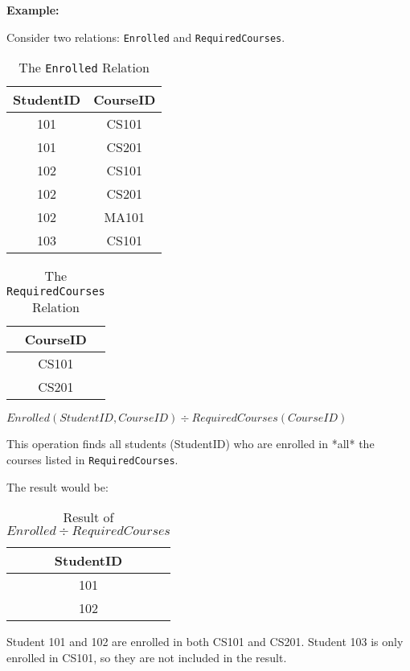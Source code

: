 \documentclass[12pt]{book}
\begin{document}
\textbf{Example:}

Consider two relations: \texttt{Enrolled} and \texttt{RequiredCourses}.

\begin{table}[htbp]
\centering
\begin{tabular}{@{}cc@{}}
\toprule
StudentID & CourseID \\
\midrule
101 & CS101 \\
101 & CS201 \\
102 & CS101 \\
102 & CS201 \\
102 & MA101 \\ %
103 & CS101 \\ %
\bottomrule
\end{tabular}
\caption{The \texttt{Enrolled} Relation}
\label{tab:enrolled_division}
\end{table}

\begin{table}[htbp]
\centering
\begin{tabular}{@{}c@{}}
\toprule
CourseID \\
\midrule
CS101 \\
CS201 \\
\bottomrule
\end{tabular}
\caption{The \texttt{RequiredCourses} Relation}
\label{tab:required_courses_division}
\end{table}

$\mathit{Enrolled}(\textit{StudentID}, \textit{CourseID}) \div \mathit{RequiredCourses}(\textit{CourseID})$

This operation finds all students (StudentID) who are enrolled in *all* the courses listed in \texttt{RequiredCourses}.

The result would be:

\begin{table}[htbp]
\centering
\begin{tabular}{@{}c@{}}
\toprule
StudentID \\
\midrule
101 \\
102 \\
\bottomrule
\end{tabular}
\caption{Result of $\mathit{Enrolled} \div \mathit{RequiredCourses}$}
\label{tab:division_result}
\end{table}

Student 101 and 102 are enrolled in both CS101 and CS201. Student 103 is only enrolled in CS101, so they are not included in the result.
\end{document}
